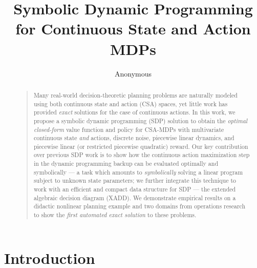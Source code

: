\documentclass[letterpaper]{article}
\begin{document}
%
\title{Symbolic Dynamic Programming for Continuous State and Action MDPs}
\author{Anonymous}
\maketitle
\begin{abstract}
\begin{quote}
Many real-world decision-theoretic planning problems are naturally
modeled using both continuous state and action (CSA) spaces, yet
little work has provided \emph{exact} solutions for the case of
continuous actions.  In this work, we propose a symbolic dynamic
programming (SDP) solution to obtain the \emph{optimal closed-form}
value function and policy for CSA-MDPs with multivariate continuous
state \emph{and} actions, discrete noise, piecewise linear dynamics,
and piecewise linear (or restricted piecewise quadratic) reward.  Our
key contribution over previous SDP work is to show how the continuous
action maximization step in the dynamic programming backup can be
evaluated optimally and symbolically --- a task which amounts to
\emph{symbolically} solving a linear program subject to unknown state
parameters; we further integrate this technique to work with an
efficient and compact data structure for SDP --- the extended
algebraic decision diagram (XADD).  We demonstrate empirical results
on a didactic nonlinear planning example and two domains from operations
research to show the \emph{first automated exact solution} to these
problems.
\end{quote}
\end{abstract}

\section{Introduction}
\end{document}
